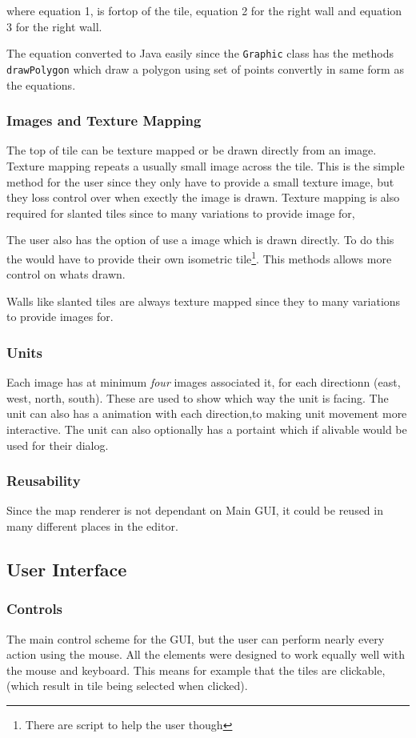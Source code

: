 where equation 1, is fortop of the tile,  equation 2 for the right wall and equation 3 for the right wall. 

The equation converted to Java easily since the \texttt{Graphic} class has the methods  \texttt{drawPolygon} which draw a polygon using set of points convertly in same form as the equations.
\subsubsection{Images and Texture Mapping}
The top of tile can be texture mapped or be drawn directly from an image.  Texture mapping repeats a usually small image across the tile. This is the simple method for the user since they only have to provide a small texture image, but they loss control over when exectly the image is drawn.  Texture mapping is also required for slanted tiles since to many variations to provide image for,

The user also has the option of use a image which is drawn directly. To do this the would have to provide their own isometric tile\footnote{There are script to help the user though}. This methods allows more control on whats drawn.  

Walls like slanted tiles are always texture mapped since they to many variations to provide images for. 

\subsubsection{Units}
Each image has at minimum \emph{four} images associated it, for each directionn (east, west, north, south). These are used to show which way the unit is facing. The unit can also has a animation with each direction,to making unit movement more interactive. The unit can also optionally has a portaint which if alivable would be used for their dialog.

\subsubsection{Reusability}
Since the map renderer is not dependant on Main GUI, it could be reused in many different places in the editor. 

\clearpage
\subsection{User Interface}
\subsubsection{Controls}
The main control scheme for the GUI, but the user can perform nearly every action using the mouse. All the elements were designed to work equally well with the mouse and keyboard. This means for example that the tiles are clickable, (which result in tile being selected when clicked).  

